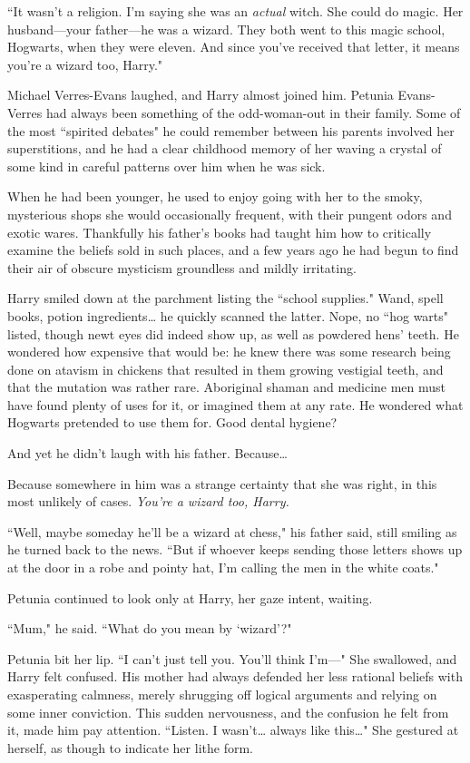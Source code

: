 ``It wasn't a religion. I'm saying she was an \emph{actual} witch. She could do magic. Her husband---your father---he was a wizard. They both went to this magic school, Hogwarts, when they were eleven. And since you've received that letter, it means you're a wizard too, Harry."

Michael Verres-Evans laughed, and Harry almost joined him. Petunia Evans-Verres had always been something of the odd-woman-out in their family. Some of the most ``spirited debates" he could remember between his parents involved her superstitions, and he had a clear childhood memory of her waving a crystal of some kind in careful patterns over him when he was sick.

When he had been younger, he used to enjoy going with her to the smoky, mysterious shops she would occasionally frequent, with their pungent odors and exotic wares. Thankfully his father's books had taught him how to critically examine the beliefs sold in such places, and a few years ago he had begun to find their air of obscure mysticism groundless and mildly irritating.

Harry smiled down at the parchment listing the ``school supplies." Wand, spell books, potion ingredients{\ldots} he quickly scanned the latter. Nope, no ``hog warts" listed, though newt eyes did indeed show up, as well as powdered hens' teeth. He wondered how expensive that would be: he knew there was some research being done on atavism in chickens that resulted in them growing vestigial teeth, and that the mutation was rather rare. Aboriginal shaman and medicine men must have found plenty of uses for it, or imagined them at any rate. He wondered what Hogwarts pretended to use them for. Good dental hygiene?

And yet he didn't laugh with his father. Because{\ldots}

Because somewhere in him was a strange certainty that she was right, in this most unlikely of cases. \emph{You're a wizard too, Harry.}

``Well, maybe someday he'll be a wizard at chess," his father said, still smiling as he turned back to the news. ``But if whoever keeps sending those letters shows up at the door in a robe and pointy hat, I'm calling the men in the white coats."

Petunia continued to look only at Harry, her gaze intent, waiting.

``Mum," he said. ``What do you mean by `wizard'?"

Petunia bit her lip. ``I can't just tell you. You'll think I'm---" She swallowed, and Harry felt confused. His mother had always defended her less rational beliefs with exasperating calmness, merely shrugging off logical arguments and relying on some inner conviction. This sudden nervousness, and the confusion he felt from it, made him pay attention. ``Listen. I wasn't{\ldots} always like this{\ldots}" She gestured at herself, as though to indicate her lithe form.

